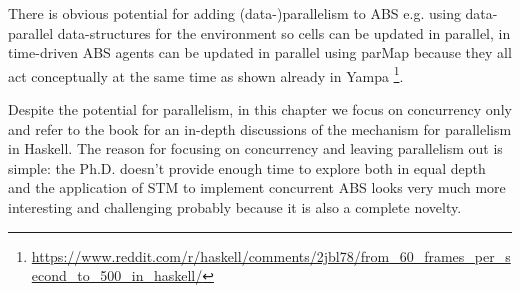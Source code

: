 There is obvious potential for adding (data-)parallelism to ABS e.g. using data-parallel data-structures for the environment so cells can be updated in parallel, in time-driven ABS agents can be updated in parallel using parMap because they all act conceptually at the same time as shown already in Yampa \footnote{\url{https://www.reddit.com/r/haskell/comments/2jbl78/from_60_frames_per_second_to_500_in_haskell/}}.

Despite the potential for parallelism, in this chapter we focus on concurrency only and refer to the book \cite{marlow_parallel_2013} for an in-depth discussions of the mechanism for parallelism in Haskell. The reason for focusing on concurrency and leaving parallelism out is simple: the Ph.D. doesn't provide enough time to explore both in equal depth and the application of STM to implement concurrent ABS looks very much more interesting and challenging probably because it is also a complete novelty.



